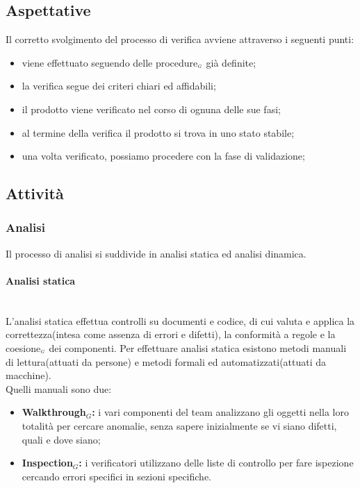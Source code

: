 \subsection{Aspettative}\label{ProcessiDiSupportoVerificaAspettative}
Il corretto svolgimento del processo di verifica avviene attraverso i seguenti punti:
\begin{itemize}
	\item viene effettuato seguendo delle procedure$_{\scaleto{G}{3pt}}$ già definite;
	\item la verifica segue dei criteri chiari ed affidabili;
	\item il prodotto viene verificato nel corso di ognuna delle sue fasi;
	\item al termine della verifica il prodotto si trova in uno stato stabile;
	\item una volta verificato, possiamo procedere con la fase di validazione;
\end{itemize}

\subsection{Attività}\label{ProcessiDiSupportoVerificaAttività}
\subsubsection{Analisi}\label{ProcessiDiSupportoVerificaAttivitàAnalisi}
Il processo di analisi si suddivide in analisi statica ed analisi dinamica.
\paragraph{Analisi statica}\label{ProcessiDiSupportoVerificaAttivitàAnalisiAnalisiStatica}\mbox{}\\
L'analisi statica effettua controlli su documenti e codice, di cui valuta e applica la correttezza(intesa come assenza di errori e difetti), la conformità a regole e la coesione$_{\scaleto{G}{3pt}}$ dei componenti.
Per effettuare analisi statica esistono metodi manuali di lettura(attuati da persone) e metodi formali ed automatizzati(attuati da macchine).\\
Quelli manuali sono due:
\begin{itemize}
	\item \textbf{Walkthrough$_G$:} i vari componenti del team analizzano gli oggetti nella loro totalità per
	cercare anomalie, senza sapere inizialmente se vi siano difetti, quali e dove siano;
	\item \textbf{Inspection$_G$:} i verificatori utilizzano delle liste di controllo per fare ispezione cercando errori specifici
	in sezioni specifiche.
\end{itemize}
